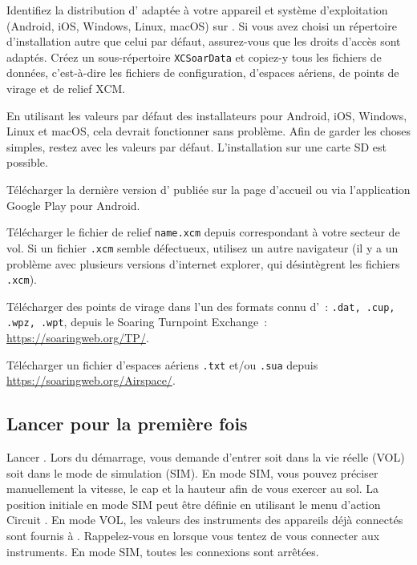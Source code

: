 \documentclass[french, a4paper, 12pt]{refrep}
\begin{document}
Identifiez la distribution d'\xc{} adaptée à votre appareil et
système d'exploitation \textsf{(Android, iOS, Windows, Linux, macOS)} 
sur .
Si vous avez choisi un répertoire d'installation autre que celui par défaut, assurez-vous que les droits
d'accès sont adaptés. Créez un sous-répertoire \texttt{XCSoarData} et copiez-y tous
les fichiers de données, c'est-à-dire les fichiers de configuration, d'espaces aériens, de points de virage et
de relief XCM.

En utilisant les valeurs par défaut des installateurs pour Android, iOS, Windows, Linux et macOS, cela devrait
fonctionner sans problème. Afin de garder les choses simples, restez avec les valeurs par défaut.
L'installation sur une carte SD est possible.

\begin{compactitem}
\item[1.] Télécharger la dernière version d'\xc{} publiée sur la page d'accueil 
\xcsoarwebsite{} ou via l'application Google Play pour Android.
\item[2.] Télécharger le fichier de relief \texttt{name.xcm} depuis
correspondant à votre secteur de vol. Si un fichier \texttt{.xcm} semble
défectueux, utilisez un autre navigateur (il y a un problème avec plusieurs versions
d'internet explorer, qui désintègrent les fichiers \texttt{.xcm}).
\item[3.] Télécharger des points de virage dans l'un des formats connu d'\xc~:
\texttt{.dat, .cup, .wpz, .wpt}, depuis le Soaring Turnpoint Exchange~:
\url{https://soaringweb.org/TP/}.
\item[4.] Télécharger un fichier d'espaces aériens \texttt{.txt} et/ou \texttt{.sua} depuis
\url{https://soaringweb.org/Airspace/}.
\end{compactitem}

\subsection{\textcolor{flashblue}{Lancer \xc{} pour la première fois}}
Lancer \xc. Lors du démarrage, \xc{} vous demande d'entrer soit dans la vie réelle (VOL) soit
dans le mode de simulation (SIM). En mode SIM, vous pouvez préciser manuellement la vitesse, le cap et la hauteur
afin de vous exercer au sol. La position initiale en mode SIM
peut être définie en utilisant le menu d'action Circuit .
En mode VOL, les valeurs des instruments des appareils déjà connectés sont fournis à \xc.
Rappelez-vous en lorsque vous tentez de vous connecter aux instruments. En mode SIM, toutes
les connexions sont arrêtées.
\end{document}
